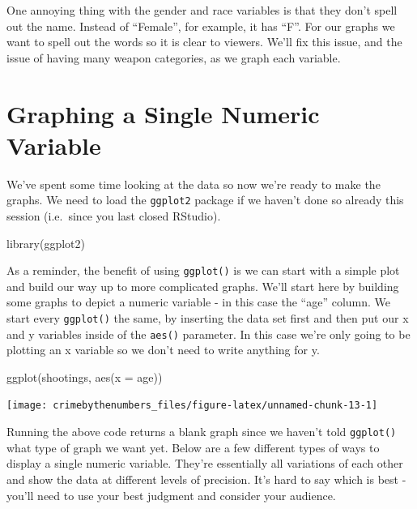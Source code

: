 \documentclass[
]{krantz}
\makeatletter
\newenvironment{Shaded}{\begin{snugshade}}{\end{snugshade}}
\newcommand{\AttributeTok}[1]{\textcolor[rgb]{0.61,0.61,0.61}{#1}}
\newcommand{\FunctionTok}[1]{\textcolor[rgb]{0,0,0}{#1}}
\newcommand{\NormalTok}[1]{#1}
\newenvironment{kframe}{%
\medskip{}
\setlength{\fboxsep}{.8em}
 \def\at@end@of@kframe{}%
 \ifinner\ifhmode%
  \def\at@end@of@kframe{\end{minipage}}%
  \begin{minipage}{\columnwidth}%
 \fi\fi%
 \def\FrameCommand##1{\hskip\@totalleftmargin \hskip-\fboxsep
 \colorbox{shadecolor}{##1}\hskip-\fboxsep
     \hskip-\linewidth \hskip-\@totalleftmargin \hskip\columnwidth}%
 \MakeFramed {\advance\hsize-\width
   \@totalleftmargin\z@ \linewidth\hsize
   \@setminipage}}%
 {\par\unskip\endMakeFramed%
 \at@end@of@kframe}
\renewenvironment{Shaded}{\begin{kframe}}{\end{kframe}}
\makeatother
\begin{document}
One annoying thing with the gender and race variables is that they don't spell out the name. Instead of ``Female'', for example, it has ``F''. For our graphs we want to spell out the words so it is clear to viewers. We'll fix this issue, and the issue of having many weapon categories, as we graph each variable.

\hypertarget{graphing-a-single-numeric-variable}{%
\section{Graphing a Single Numeric Variable}\label{graphing-a-single-numeric-variable}}

We've spent some time looking at the data so now we're ready to make the graphs. We need to load the \texttt{ggplot2} package if we haven't done so already this session (i.e.~since you last closed RStudio).

\begin{Shaded}
\begin{Highlighting}[]
\FunctionTok{library}\NormalTok{(ggplot2)}
\end{Highlighting}
\end{Shaded}

As a reminder, the benefit of using \texttt{ggplot()} is we can start with a simple plot and build our way up to more complicated graphs. We'll start here by building some graphs to depict a numeric variable - in this case the ``age'' column. We start every \texttt{ggplot()} the same, by inserting the data set first and then put our x and y variables inside of the \texttt{aes()} parameter. In this case we're only going to be plotting an x variable so we don't need to write anything for y.

\begin{Shaded}
\begin{Highlighting}[]
\FunctionTok{ggplot}\NormalTok{(shootings, }\FunctionTok{aes}\NormalTok{(}\AttributeTok{x =}\NormalTok{ age))}
\end{Highlighting}
\end{Shaded}

\begin{center}\texttt{[image: crimebythenumbers\_files/figure-latex/unnamed-chunk-13-1]} \end{center}

Running the above code returns a blank graph since we haven't told \texttt{ggplot()} what type of graph we want yet. Below are a few different types of ways to display a single numeric variable. They're essentially all variations of each other and show the data at different levels of precision. It's hard to say which is best - you'll need to use your best judgment and consider your audience.
\end{document}
